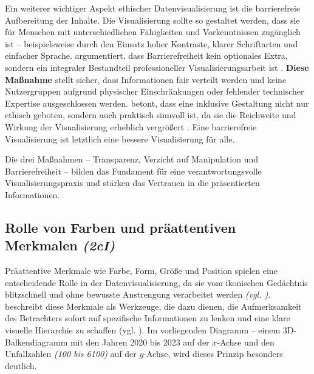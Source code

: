 Ein weiterer wichtiger Aspekt ethischer Datenvisualisierung ist die barrierefreie Aufbereitung der Inhalte. Die Visualisierung sollte so gestaltet werden, dass sie für Menschen mit unterschiedlichen Fähigkeiten und Vorkenntnissen zugänglich ist – beispielsweise durch den Einsatz hoher Kontraste, klarer Schriftarten und einfacher Sprache. \citeauthor{2} argumentiert, dass Barrierefreiheit kein optionales Extra, sondern ein integraler Bestandteil professioneller Visualisierungsarbeit ist \cite[37, 40]{2}. \textbf{Diese Maßnahme} stellt sicher, dass Informationen fair verteilt werden und keine Nutzergruppen aufgrund physischer Einschränkungen oder fehlender technischer Expertise ausgeschlossen werden. \citeauthor{2} betont, dass eine inklusive Gestaltung nicht nur ethisch geboten, sondern auch praktisch sinnvoll ist, da sie die Reichweite und Wirkung der Visualisierung erheblich vergrößert \cite[39, 40]{2}. Eine barrierefreie Visualisierung ist letztlich eine bessere Visualisierung für alle.

Die drei Maßnahmen – Transparenz, Verzicht auf Manipulation und Barrierefreiheit – bilden das Fundament für eine verantwortungsvolle Visualisierungspraxis und stärken das Vertrauen in die präsentierten Informationen.


\subsection{Rolle von Farben und präattentiven Merkmalen \textit{(2cI)}}

Präattentive Merkmale wie Farbe, Form, Größe und Position spielen eine entscheidende Rolle in der Datenvisualisierung, da sie vom ikonischen Gedächtnis blitzschnell und ohne bewusste Anstrengung verarbeitet werden \textit{(\acs{vgl.} \cite[16, 31]{2})}. \citeauthor{2} beschreibt diese Merkmale als Werkzeuge, die dazu dienen, die Aufmerksamkeit des Betrachters sofort auf spezifische Informationen zu lenken und eine klare visuelle Hierarchie zu schaffen (vgl. \cite[52, 60]{2}). Im vorliegenden Diagramm – einem 3D-Balkendiagramm mit den Jahren 2020 bis 2023 auf der \(x\)-Achse und den Unfallzahlen \textit{(100 bis 6100)} auf der \(y\)-Achse, wird dieses Prinzip besonders deutlich.

